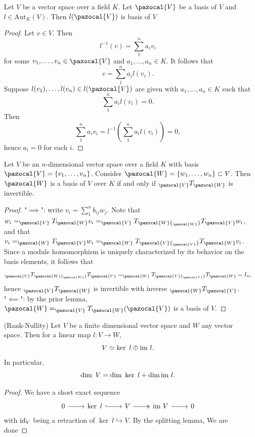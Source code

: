 \begin{lemma}
    Let $V$ be a vector space over a field $K$. Let $\pazocal{V}$ be a basis of $V$ and $l\in \mathrm{Aut}_K(V)$. Then $l(\pazocal{V})$ is basis of $V$
\end{lemma}
\begin{proof}
    Let $v\in V$. Then 
    $$
        l^{-1}(v) = \sum_1^n a_iv_i
    $$
    for some $v_1,\dots,v_n\in \pazocal{V}$ and $a_1,\dots,a_n\in K$. It follows that 
    $$
        v = \sum_1^n a_il(v_i).
    $$
    Suppose $l(v_1),\dots,l(v_n)\in l(\pazocal{V})$ are given with $a_1,\dots,a_n\in K$ such that 
    $$
        \sum_1^n a_il(v_i)=0.
    $$
    Then 
    $$
        \sum_1^n a_iv_i = l^{-1}\left(\sum_1^n a_il(v_i) \right)=0,
    $$
    hence $a_i = 0$ for each $i$.
\end{proof}
\begin{theorem}\label{BasisTransformationTheorem}
    Let $V$ be an $n$-dimensional vector space over a field $K$ with basis $\pazocal{V}=\{v_1,\dots,v_n\}$. Consider $\pazocal{W}=\{w_1,\dots,w_n\}\subset V$. Then $\pazocal{W}$ is a basis of $V$ over $K$ if and only if $_\pazocal{V}T_\pazocal{W}$ is invertible.  
\end{theorem}
\begin{proof}
    "$\implies$": write $v_i = \sum_1^n b_{ij}w_j$. Note that 
    $w_i = _\pazocal{V}T_\pazocal{W} v_i = _\pazocal{V}T_\pazocal{W} {_\pazocal{W}}T_\pazocal{V} w_i$, and that $v_i = _\pazocal{W}T_\pazocal{V} w_i = _\pazocal{W}T_\pazocal{V} {_\pazocal{V}}T_\pazocal{W} v_i$. Since a module homomorphism is uniquely characterized by its behavior on the basis elements, it follows that 
    $$
        _\pazocal{V}T_\pazocal{W} {_\pazocal{W}}T_\pazocal{V} = _\pazocal{W}T_\pazocal{V} {_\pazocal{V}}T_\pazocal{W} = I_n,
    $$ 
    hence ${_\pazocal{V}}T_\pazocal{W}$ is invertible with inverse ${_\pazocal{W}}T_\pazocal{V}$.\\
    "$\impliedby$": by the prior lemma, $\pazocal{W} = _\pazocal{V}T_\pazocal{W}(\pazocal{V})$ is a basis of $V$.
\end{proof}
\begin{lemma}(Rank-Nullity)
    Let $V$ be a finite dimensional vector space and $W$ any vector space. Then for a linear map $l : V\rightarrow W$,
    $$
        V \simeq \ker \ l \oplus \mathrm{im} \ l.
    $$
    In particular,
    $$
        \dim \ V = \dim \ \ker\ l + \dim \mathrm{im} \ l. 
    $$ 
\end{lemma}
\begin{proof}
    We have a short exact sequence 
    $$
        \begin{tikzcd}
            0 \arrow[r] & \ker \ l \arrow[r,hookrightarrow] & V \arrow[r, twoheadrightarrow] & \im \ V \arrow[r] & 0
        \end{tikzcd}
    $$
    with $\mathrm{id}_V$ being a retraction of $\ker\ l \hookrightarrow V$. By the splitting lemma, We are done
\end{proof}

